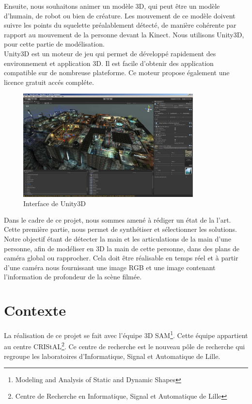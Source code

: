 Ensuite, nous souhaitons animer un modèle 3D, qui peut être un modèle 
d'humain, de robot ou bien de créature. Les mouvement de ce modèle 
doivent suivre les points du squelette préalablement détecté, de 
manière cohérente par rapport au mouvement de la personne devant la 
Kinect. Nous utilisons Unity3D, pour cette partie de 
modélisation.\\

Unity3D est un moteur de jeu qui permet de développé rapidement des 
environnement et application 3D. Il est facile d'obtenir des 
application compatible sur de nombreuse plateforme. Ce moteur 
propose également une licence gratuit accés compléte.\\

\begin{figure}[H]
  \begin{center}
    \includegraphics[width=350px]{images/Unity3D.jpg}
    \caption{Interface de Unity3D}
  \end{center}
\end{figure}

Dans le cadre de ce projet, nous sommes amené à rédiger un état de la 
l'art. Cette première partie, nous permet de synthétiser et sélectionner 
les solutions. Notre objectif étant de détecter la main et les 
articulations de la main d'une personne, afin de modéliser en 3D la main 
de cette personne, dans des plans de caméra global ou rapprocher. Cela 
doit être réalisable en temps réel et à partir d'une caméra nous 
fournissant une image RGB et une image contenant l'information de 
profondeur de la scène filmée.\\

\section{Contexte}
La réalisation de ce projet se fait avec l'équipe 3D 
SAM\footnote{Modeling and Analysis of Static and Dynamic Shapes}. 
Cette équipe appartient au centre CRIStAL\footnote{Centre de Recherche 
en Informatique, Signal et Automatique de Lille}. Ce centre de 
recherche est le nouveau pôle de recherche qui regroupe les 
laboratoires d'Informatique, Signal et Automatique de Lille.\\


